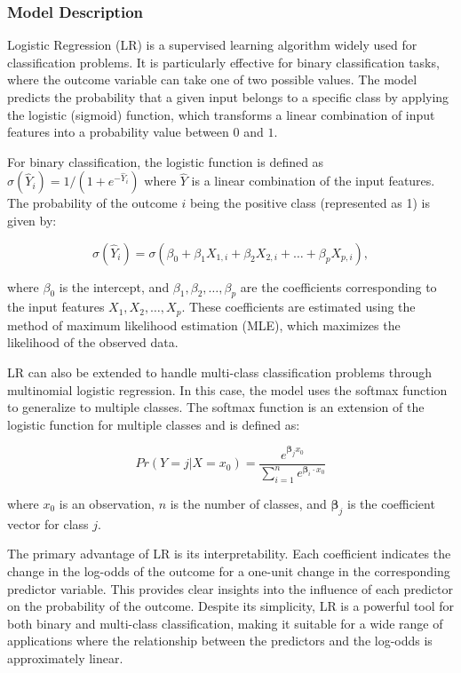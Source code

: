 \documentclass[
  letterpaper,
  DIV=11,
  numbers=noendperiod]{scrartcl}
\begin{document}
\subsubsection{Model Description}\label{model-description-3}

Logistic Regression (LR) is a supervised learning algorithm widely used
for classification problems. It is particularly effective for binary
classification tasks, where the outcome variable can take one of two
possible values. The model predicts the probability that a given input
belongs to a specific class by applying the logistic (sigmoid) function,
which transforms a linear combination of input features into a
probability value between \(0\) and \(1\).

For binary classification, the logistic function is defined as
\(\sigma(\hat{Y}_i) = 1/(1 + e^{-\hat{Y}_i})\) where \(\hat{Y}\) is a
linear combination of the input features. The probability of the outcome
\(i\) being the positive class (represented as 1) is given by:

\[\sigma(\hat{Y}_i) = \sigma(\beta_0 + \beta_1 X_{1, i} + \beta_2 X_{2, i} + \ldots + \beta_p X_{p, i}),\]

where \(\beta_0\) is the intercept, and
\(\beta_1, \beta_2, \ldots, \beta_p\) are the coefficients corresponding
to the input features \(X_1, X_2, \ldots, X_p\). These coefficients are
estimated using the method of maximum likelihood estimation (MLE), which
maximizes the likelihood of the observed data.

LR can also be extended to handle multi-class classification problems
through multinomial logistic regression. In this case, the model uses
the softmax function to generalize to multiple classes. The softmax
function is an extension of the logistic function for multiple classes
and is defined as:

\[Pr(Y = j | X = x_0) = \frac{e^{\mathbf{\beta}_j x_0}}{\sum_{i=1}^{n} e^{\mathbf{\beta}_i \cdot x_0}}\]

where \(x_0\) is an observation, \(n\) is the number of classes, and
\(\mathbf{\beta}_j\) is the coefficient vector for class \(j\).

The primary advantage of LR is its interpretability. Each coefficient
indicates the change in the log-odds of the outcome for a one-unit
change in the corresponding predictor variable. This provides clear
insights into the influence of each predictor on the probability of the
outcome. Despite its simplicity, LR is a powerful tool for both binary
and multi-class classification, making it suitable for a wide range of
applications where the relationship between the predictors and the
log-odds is approximately linear.
\end{document}
